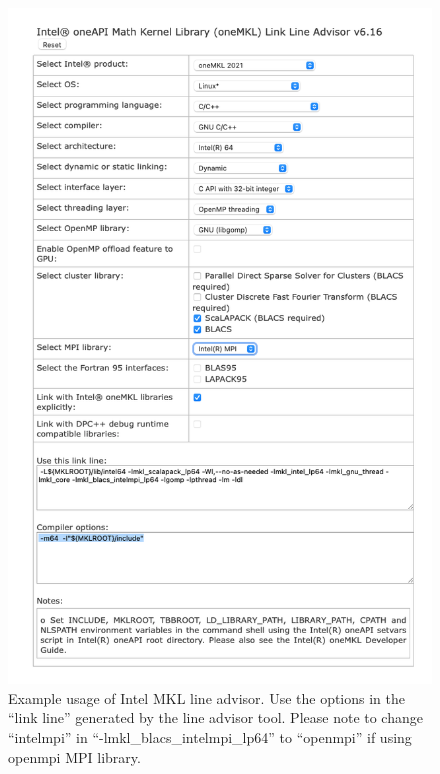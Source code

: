 \begin{figure}[htp]
    \centering
\includegraphics[scale=0.4]{intelmklLineAdvisorExampleNew.png}
    \caption{Example usage of Intel MKL line advisor. Use the options in the ``link line'' generated by the line advisor tool. Please note to change ``intelmpi'' in ``-lmkl\_blacs\_intelmpi\_lp64'' to ``openmpi'' if using openmpi MPI library.}
    \label{fig:intelmkl}
\end{figure}


